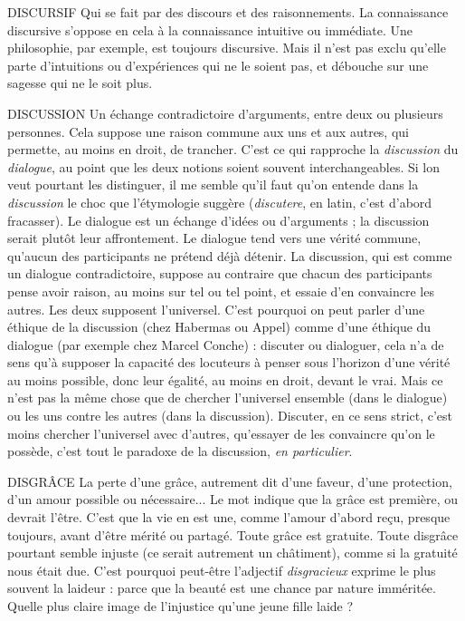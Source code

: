DISCURSIF Qui se fait par des discours et des raisonnements. La connaissance
discursive s'oppose en cela à la connaissance intuitive ou
immédiate. Une philosophie, par exemple, est toujours discursive. Mais il n’est
pas exclu qu’elle parte d’intuitions ou d’expériences qui ne le soient pas, et
débouche sur une sagesse qui ne le soit plus.

DISCUSSION Un échange contradictoire d'arguments, entre deux ou plusieurs
personnes. Cela suppose une raison commune aux uns
et aux autres, qui permette, au moins en droit, de trancher. C’est ce qui rapproche
la {\it discussion} du {\it dialogue}, au point que les deux notions soient souvent
interchangeables. Si lon veut pourtant les distinguer, il me semble qu’il faut
qu'on entende dans la {\it discussion} le choc que l’étymologie suggère ({\it discutere}, en
latin, c’est d’abord fracasser). Le dialogue est un échange d’idées ou d’arguments ;
la discussion serait plutôt leur affrontement. Le dialogue tend vers une vérité
commune, qu'aucun des participants ne prétend déjà détenir. La discussion, qui
est comme un dialogue contradictoire, suppose au contraire que chacun des participants
pense avoir raison, au moins sur tel ou tel point, et essaie d’en
convaincre les autres. Les deux supposent l’universel. C’est pourquoi on peut
parler d’une éthique de la discussion (chez Habermas ou Appel) comme d’une
éthique du dialogue (par exemple chez Marcel Conche) : discuter ou dialoguer,
cela n’a de sens qu’à supposer la capacité des locuteurs à penser sous l'horizon
d’une vérité au moins possible, donc leur égalité, au moins en droit, devant le
vrai. Mais ce n’est pas la même chose que de chercher l’universel ensemble (dans
le dialogue) ou les uns contre les autres (dans la discussion). Discuter, en ce sens
strict, c'est moins chercher l’universel avec d’autres, qu’essayer de les convaincre
qu’on le possède, c’est tout le paradoxe de la discussion, {\it en particulier}.

DISGRÂCE La perte d’une grâce, autrement dit d’une faveur, d’une protection,
d’un amour possible ou nécessaire... Le mot indique
que la grâce est première, ou devrait l’être. C’est que la vie en est une, comme
l'amour d’abord reçu, presque toujours, avant d’être mérité ou partagé. Toute
grâce est gratuite. Toute disgrâce pourtant semble injuste (ce serait autrement
un châtiment), comme si la gratuité nous était due. C’est pourquoi peut-être
l'adjectif {\it disgracieux} exprime le plus souvent la laideur : parce que la beauté est
une chance par nature imméritée. Quelle plus claire image de l’injustice qu’une
jeune fille laide ?

